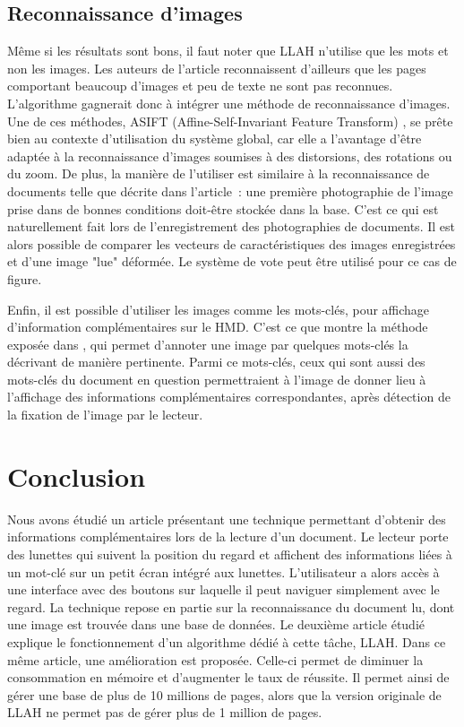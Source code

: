 \documentclass[a4paper]{article}
\begin{document}
\subsection{Reconnaissance d'images}
Même si les résultats sont bons, il faut noter que LLAH n'utilise que les mots et non les images. Les auteurs de l'article reconnaissent d'ailleurs que les pages comportant beaucoup d'images et peu de texte ne sont pas reconnues. L'algorithme gagnerait donc à intégrer une méthode de reconnaissance d'images. Une de ces méthodes, ASIFT (Affine-Self-Invariant Feature Transform) \cite{asift}, se prête bien au contexte d'utilisation du système global, car elle a l'avantage d'être adaptée à la reconnaissance d'images soumises à des distorsions, des rotations ou du zoom. De plus, la manière de l'utiliser est similaire à la reconnaissance de documents telle que décrite dans l'article~: une première photographie de l'image prise dans de bonnes conditions doit-être stockée dans la base. C'est ce qui est naturellement fait lors de l'enregistrement des photographies de documents. Il est alors possible de comparer les vecteurs de caractéristiques des images enregistrées et d'une image "lue" déformée. Le système de vote peut être utilisé pour ce cas de figure. 

Enfin, il est possible d'utiliser les images comme les mots-clés, pour affichage d'information complémentaires sur le HMD. C'est ce que montre la méthode exposée dans \cite{annotation}, qui permet d'annoter une image par quelques mots-clés la décrivant de manière pertinente. Parmi ce mots-clés, ceux qui sont aussi des mots-clés du document en question permettraient à l'image de donner lieu à l'affichage des informations complémentaires correspondantes, après détection de la fixation de l'image par le lecteur.

\section{Conclusion}
Nous avons étudié un article présentant une technique permettant d'obtenir des informations complémentaires lors de la lecture d'un document. Le lecteur porte des lunettes qui suivent la position du regard et affichent des informations liées à un mot-clé sur un petit écran intégré aux lunettes. L'utilisateur a alors accès à une interface avec des boutons sur laquelle il peut naviguer simplement avec le regard. La technique repose en partie sur la reconnaissance du document lu, dont une image est trouvée dans une base de données. Le deuxième article étudié explique le fonctionnement d'un algorithme dédié à cette tâche, LLAH. Dans ce même article, une amélioration est proposée. Celle-ci permet de diminuer la consommation en mémoire et d'augmenter le taux de réussite. Il permet ainsi de gérer une base de plus de 10 millions de pages, alors que la version originale de LLAH ne permet pas de gérer plus de 1 million de pages.
\end{document}
